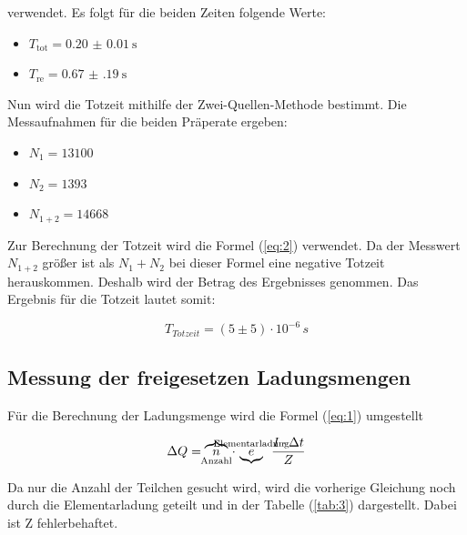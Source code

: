 verwendet. Es folgt für die beiden Zeiten folgende Werte:

\begin{itemize}
  \item $T_\text{tot} = \SI{0.20(1)}{\second}$
  \item $T_\text{re} = \SI{0.67(19)}{\second}$
\end{itemize}

Nun wird die Totzeit mithilfe der Zwei-Quellen-Methode bestimmt.
Die Messaufnahmen für die beiden Präperate ergeben:

\begin{itemize}
  \item $N_1 = 13100$
  \item $N_2 = 1393$
  \item $N_{1+2} = 14668$
\end{itemize}

Zur Berechnung der Totzeit wird die Formel (\ref{eq:2}) verwendet.
Da der Messwert $N_{1+2}$ größer ist als $N_1 + N_2$ bei dieser Formel eine
negative Totzeit herauskommen. Deshalb wird der Betrag des Ergebnisses genommen.
Das Ergebnis  für die Totzeit lautet somit:

\begin{equation*}
  T_{Totzeit} = (5 \pm 5) \cdot 10^{-6} \, s
\end{equation*}


\subsection{Messung der freigesetzen Ladungsmengen}

Für die Berechnung der Ladungsmenge wird die Formel (\ref{eq:1}) umgestellt

\begin{equation*}
  \Delta Q =\overbrace{n}_{\mathclap{\text{Anzahl}}} \, \cdot \, \underbrace{e}^{\mathclap{\text{Elementarladung}}}  \,\,\, \frac{I \cdot \Delta t}{Z}
\end{equation*}

Da nur die Anzahl der Teilchen gesucht wird, wird die vorherige Gleichung noch durch die Elementarladung geteilt und in der Tabelle (\ref{tab:3})
dargestellt. Dabei ist Z fehlerbehaftet.

